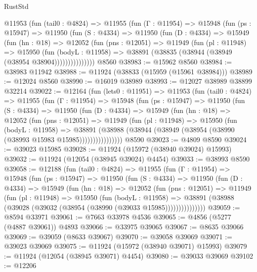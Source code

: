 \begin{lexlean}{RustStd}
\begin{coremodule}
{\begin{coremodule}
{{{{{{{{{{{{{{{{{{{{{{{{{{{{{{{{{{{{{{{{{{{{{{{{{{{{{{{{{{{{{{{{{{{{{{{{{{{{{{{{      @11953
        (fun (tail0 : @4824) =>
        @11955
          (fun (Γ : @11954) =>
          @15948
            (fun (ps : @15947) =>
            @11950
              (fun (S : @4334) =>
              @11950
                (fun (D : @4334) =>
                @15949
                  (fun (hn : @18) =>
                  @12052
                    (fun (pns : @12051) =>
                    @11949
                      (fun (pl : @11948) =>
                      @15950
                        (fun (bodyL : @11958) =>
                        @38891 (@38835 (@38944 (@38949 (@38954 @38904)))))))))))))))
    @8560
@38983 := @15962 @8560
@38984 := @38983 @11942
@38988 := @11924 (@38833 (@15959 (@15961 @38984)))
@38989 := @12024 @8560
@38990 := @16019 @38989
@38993 := @12027 @38989 @38899 @32214
@39022 := @12164
    (fun (lets0 : @11951) =>
    @11953
      (fun (tail0 : @4824) =>
      @11955
        (fun (Γ : @11954) =>
        @15948
          (fun (ps : @15947) =>
          @11950
            (fun (S : @4334) =>
            @11950
              (fun (D : @4334) =>
              @15949
                (fun (hn : @18) =>
                @12052
                  (fun (pns : @12051) =>
                  @11949
                    (fun (pl : @11948) =>
                    @15950
                      (fun (bodyL : @11958) =>
                      @38891
                        (@38988
                          (@38944 (@38949 (@38954 (@38990 (@38993 @15983 @15985))))))))))))))))
    @8590
@39023 := @4809 @8590
@39024 := @39023 @15985
@39028 := @11924 (@15972 (@38940 @39024) @15993)
@39032 := @11924 (@12054 (@38945 @39024) @4454)
@39033 := @38993 @8590
@39058 := @12188
    (fun (tail0 : @4824) =>
    @11955
      (fun (Γ : @11954) =>
      @15948
        (fun (ps : @15947) =>
        @11950
          (fun (S : @4334) =>
          @11950
            (fun (D : @4334) =>
            @15949
              (fun (hn : @18) =>
              @12052
                (fun (pns : @12051) =>
                @11949
                  (fun (pl : @11948) =>
                  @15950
                    (fun (bodyL : @11958) =>
                    @38891 (@38988 (@39028 (@39032 (@38954 (@38990 (@39033 @15985)))))))))))))))
@39059 := @8594 @33971
@39061 := @7663 @33978 @4536
@39065 := @4856 (@5277 (@4887 @39061)) @4893
@39066 := @33975 @39065
@39067 := @8635 @39066
@39069 := @39059 (@8633 @39067)
@39070 := @39058 @39069
@39071 := @39023 @39069
@39075 := @11924 (@15972 (@38940 @39071) @15993)
@39079 := @11924 (@12054 (@38945 @39071) @4454)
@39080 := @39033 @39069
@39102 := @12206
}}}}}}}}}}}}}}}}}}}}}}}}}}}}}}}}}}}}}}}}}}}}}}}}}}}}}}}}}}}}}}}}}}}}}}}}}}}}}}}}
\end{coremodule}}
\end{coremodule}
\end{lexlean}
